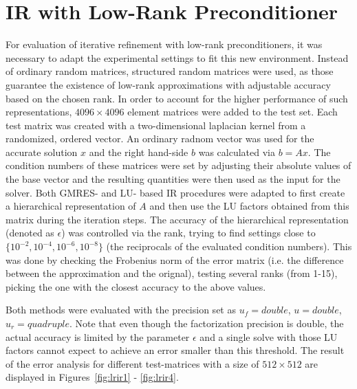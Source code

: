 \section{IR with Low-Rank Preconditioner}
\label{sec:low_rank}

For evaluation of iterative refinement with low-rank preconditioners, it was necessary to adapt the experimental settings to fit this new environment. Instead of ordinary random matrices, structured random matrices were used, as those guarantee the existence of low-rank approximations with adjustable accuracy based on the chosen rank. In order to account for the higher performance of such representations, $4096 \times 4096$ element matrices were added to the test set. Each test matrix was created with a two-dimensional laplacian kernel from a randomized, ordered vector. An ordinary radnom vector was used for the accurate solution $x$ and the right hand-side $b$ was calculated via $b = Ax$. The condition numbers of these matrices were set by adjusting their absolute values of the base vector and the resulting quantities were then used as the input for the solver. Both GMRES- and LU- based IR procedures were adapted to first create a hierarchical representation of $A$ and then use the LU factors obtained from this matrix during the iteration steps. The accuracy of the hierarchical representation (denoted as $\epsilon$) was controlled via the rank, trying to find settings close to $\{10^{-2}, 10^{-4}, 10^{-6}, 10^{-8}\}$ (the reciprocals of the evaluated condition numbers). This was done by checking the Frobenius norm of the error matrix (i.e. the difference between the approximation and the orignal), testing several ranks (from 1-15), picking the one with the closest accuracy to the above values.

Both methods were evaluated with the precision set as $u_f= double$, $u= double$, $u_r= quadruple$.
Note that even though the factorization precision is double, the actual accuracy is limited by the parameter $\epsilon$ and a single solve with those LU factors cannot expect to achieve an error smaller than this threshold. The result of the error analysis for different test-matrices with a size of $512 \times 512$ are displayed in Figures~\hyperref[fig:lrir1]{\ref{fig:lrir1}} - \hyperref[fig:lrir4]{\ref{fig:lrir4}}.

